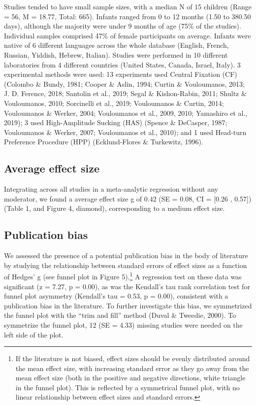 \documentclass[man]{apa6}
\let\rmarkdownfootnote\footnote%
\def\footnote{\protect\rmarkdownfootnote}
\begin{document}
Studies tended to have small sample sizes, with a median N of 15
children (Range = 56, M = 18.77, Total: 665). Infants ranged from 0 to
12 months (1.50 to 380.50 days), although the majority were under 9
months of age (75\% of the studies). Individual samples comprised 47\%
of female participants on average. Infants were native of 6 different
languages across the whole database (English, French, Russian, Yiddish,
Hebrew, Italian). Studies were performed in 10 different laboratories
from 4 different countries (United States, Canada, Israel, Italy). 3
experimental methods were used: 13 experiments used Central Fixation
(CF) (Colombo \& Bundy, 1981; Cooper \& Aslin, 1994; Curtin \&
Vouloumanos, 2013; J. D. Ference, 2018; Santolin et al., 2019; Segal \&
Kishon-Rabin, 2011; Shultz \& Vouloumanos, 2010; Sorcinelli et al.,
2019; Vouloumanos \& Curtin, 2014; Vouloumanos \& Werker, 2004;
Vouloumanos et al., 2009, 2010; Yamashiro et al., 2019); 3 used
High-Amplitude Sucking (HAS) (Spence \& DeCasper, 1987; Vouloumanos \&
Werker, 2007; Vouloumanos et al., 2010); and 1 used Head-turn Preference
Procedure (HPP) (Ecklund-Flores \& Turkewitz, 1996).

\subsection{Average effect size}\label{average-effect-size}

Integrating across all studies in a meta-analytic regression without any
moderator, we found a average effect size g of 0.42 (SE = 0.08, CI =
{[}0.26 , 0.57{]}) (Table 1, and Figure 4, diamond), corresponding to a
medium effect size.

\subsection{Publication bias}\label{publication-bias}

We assessed the presence of a potential publication bias in the body of
literature by studying the relationship between standard errors of
effect sizes as a function of Hedges' g (see funnel plot in Figure
5).\footnote{If the literature is not biased, effect sizes should be
  evenly distributed around the mean effect size, with increasing
  standard error as they go away from the mean effect size (both in the
  positive and negative directions, white triangle in the funnel plot).
  This is reflected by a symmetrical funnel plot, with no linear
  relationship between effect sizes and standard errors.} A regression
test on these data was significant (z = 7.27, p = 0.00), as was the
Kendall's tau rank correlation test for funnel plot asymmetry (Kendall's
tau = 0.53, p = 0.00), consistent with a publication bias in the
literature. To further investigate this bias, we symmetrized the funnel
plot with the \enquote{trim and fill} method (Duval \& Tweedie, 2000).
To symmetrize the funnel plot, 12 (SE = 4.33) missing studies were
needed on the left side of the plot.
\end{document}
